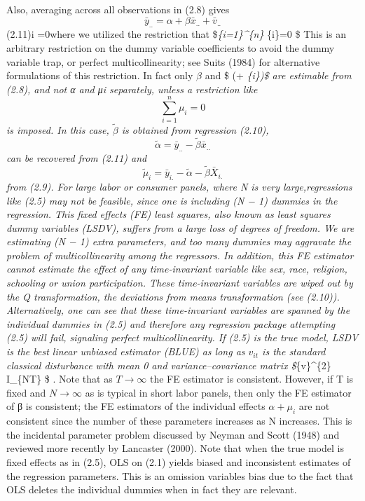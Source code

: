 \documentclass[
]{book}
\begin{document}
Also, averaging across all observations in (2.8) gives
\[\bar{y}_{..}=\alpha + \beta \bar{x}_{..} + \bar{v}_{..} \]
(2.11)i
=0where we utilized the restriction that \$\sum\emph{\{i=1\}\^{}\{n\} \mu}\{i\}=0 \$ This is an arbitrary restriction on the dummy
variable coefficients to avoid the dummy variable trap, or perfect multicollinearity; see Suits
(1984) for alternative formulations of this restriction. In fact only \(\beta\) and \$ (\alpha + \mu\emph{\{i\})\$ are estimable
from (2.8), and not α and μi separately, unless a restriction like \[\sum_{i=1}^{n} \mu_{i}=0 \] is imposed. In
this case, \(\widetilde {\beta}\) is obtained from regression (2.10),
\[\widetilde {\alpha}= \bar {y}_{..}-\widetilde {\beta} \bar{x}_{..} \] can be recovered from (2.11)
and \[\widetilde {\mu}_{i}=\bar{y}_{i.}- \widetilde {\alpha} - \widetilde {\beta} \bar{X}_{i.} \] from (2.9). For large labor or consumer panels, where N is very large,regressions like (2.5) may not be feasible, since one is including (N − 1) dummies in the regression. This fixed effects (FE) least squares, also known as least squares dummy variables (LSDV), suffers from a large loss of degrees of freedom. We are estimating (N − 1) extra parameters, and too many dummies may aggravate the problem of multicollinearity among
the regressors. In addition, this FE estimator cannot estimate the effect of any time-invariant variable like sex, race, religion, schooling or union participation. These time-invariant variables are wiped out by the Q transformation, the deviations from means transformation (see (2.10)).
Alternatively, one can see that these time-invariant variables are spanned by the individual dummies in (2.5) and therefore any regression package attempting (2.5) will fail, signaling perfect multicollinearity. If (2.5) is the true model, LSDV is the best linear unbiased estimator (BLUE)
as long as \(v_{it}\) is the standard classical disturbance with mean 0 and variance--covariance
matrix \$\sigma }\{v\}\^{}\{2\} I\_\{NT\} \$ .
Note that as \(T \rightarrow \infty\)
the FE estimator is consistent. However, if T is fixed and \(N \rightarrow \infty\) as is typical in short labor panels, then only the FE estimator of β is consistent; the
FE estimators of the individual effects
\(\alpha + \mu_{i}\) are not consistent since the number of these
parameters increases as N increases. This is the incidental parameter problem discussed by
Neyman and Scott (1948) and reviewed more recently by Lancaster (2000). Note that when the
true model is fixed effects as in (2.5), OLS on (2.1) yields biased and inconsistent estimates of
the regression parameters. This is an omission variables bias due to the fact that OLS deletes
the individual dummies when in fact they are relevant.
\end{document}
